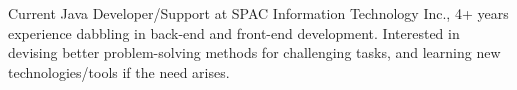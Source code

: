 

\begin{cvparagraph}

Current Java Developer/Support at SPAC Information Technology Inc., 4+ years experience dabbling in back-end and front-end development. Interested in devising better problem-solving methods for challenging tasks, and learning new technologies/tools if the need arises.
\end{cvparagraph}
